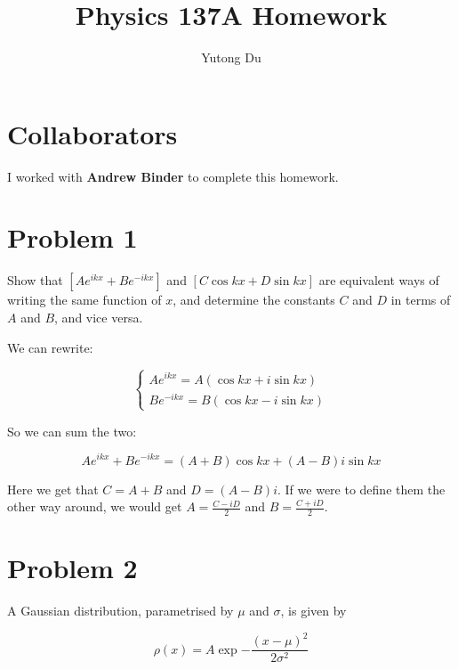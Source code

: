 \documentclass{article}
\title{Physics 137A Homework}
\author{Yutong Du}
\begin{document}
\maketitle 

\section*{Collaborators}

I worked with \textbf{Andrew Binder} to complete this homework.

\section*{Problem 1}

Show that $[Ae^{ikx} + Be^{-ikx}]$ and $[C \cos kx + D \sin kx]$ are equivalent ways of writing the same function of $x$, and determine the constants $C$ and $D$ in terms of $A$ and $B$, and vice versa. 


\begin{solution}
    We can rewrite:

    \[ \begin{cases}
        Ae^{ikx} = A(\cos kx + i \sin kx)\\
        Be^{-ikx} = B(\cos kx - i \sin kx)
    \end{cases}\]

    So we can sum the two:

    \[ Ae^{ikx} + Be^{-ikx} = (A+B)\cos kx + (A - B)i \sin kx\]

    Here we get that $C = A+B$ and $D = (A-B)i$. If we were to define them the other way around, we would get $A = \frac{C - iD}{2}$ and $B = \frac{C + iD}{2}$.
\end{solution}

\pagebreak
\section*{Problem 2}

A Gaussian distribution, parametrised by $\mu$ and $\sigma$, is given by 

\[ \rho(x) = A \exp{-\frac{(x - \mu)^2}{2\sigma^2}}\]
\end{document}
